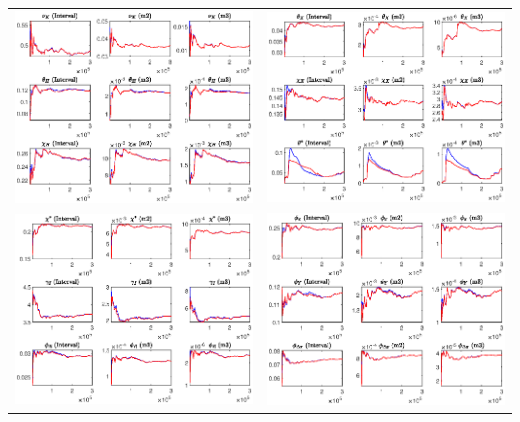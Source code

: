 \documentclass[a4paper,11pt]{article}
\numberwithin{equation}{section}
\begin{document}
\begin{minipage}{\linewidth}
{\begin{tabular}{p{9cm} p{9cm}}
			\includegraphics[width=9cm, trim =0 0 0.97cm 0]{SAFiscal_udiag9.eps} & \includegraphics[width=9cm, trim =0.97cm 0 0 0]{SAFiscal_udiag10.eps}\\
			\includegraphics[width=9cm, trim =0 0 0.97cm 0]{SAFiscal_udiag11.eps} & \includegraphics[width=9cm, trim =0.97cm 0 0 0]{SAFiscal_udiag12.eps}\\
		\end{tabular}
	}
\end{minipage}
\end{document}
